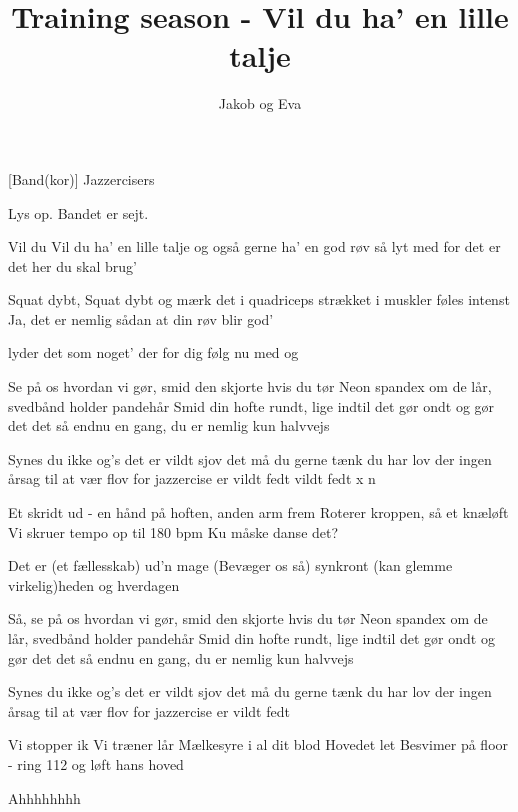 \documentclass{ucph-revy}
\author{Jakob og Eva}
\title{Training season - Vil du ha' en lille talje}
\begin{document}
\maketitle
	\begin{roles}
		[Band(kor)] Jazzercisers
	\end{roles}



\begin{song}

\scene Lys op. 
\scene Bandet er sejt. %



 Vil du
Vil du ha’ en lille talje
og også gerne ha’ en god røv
så lyt med for det er det her du skal brug’

Squat dybt, 
Squat dybt og mærk det i quadriceps
strækket i muskler føles intenst
Ja, det er nemlig sådan at din røv blir god’

lyder det som noget’ der for dig
følg nu med og

Se på os hvordan vi gør, smid den skjorte hvis du tør
Neon spandex om de lår, svedbånd holder pandehår
Smid din hofte rundt, lige indtil det gør ondt
og gør det det så endnu en gang, du er nemlig kun halvvejs

Synes du ikke og’s det er vildt sjov  
det må du gerne tænk du har lov
der ingen årsag til at vær flov
for jazzercise er vildt fedt
vildt fedt x n

Et skridt ud - en hånd på hoften, anden arm frem
Roterer kroppen, så et knæløft
Vi skruer tempo op til 180 bpm
\scene Ku måske danse det?

Det er (et fællesskab) ud’n mage
(Bevæger os så) synkront
(kan glemme virkelig)heden 
og hverdagen

Så, se på os hvordan vi gør, smid den skjorte hvis du tør
Neon spandex om de lår, svedbånd holder pandehår
Smid din hofte rundt, lige indtil det gør ondt
og gør det det så endnu en gang, du er nemlig kun halvvejs

Synes du ikke og’s det er vildt sjov  
det må du gerne tænk du har lov
der ingen årsag til at vær flov
for jazzercise er vildt fedt

Vi stopper ik
Vi træner lår
Mælkesyre i al dit blod
Hovedet let
Besvimer på floor - ring 112 og løft hans hoved

Ahhhhhhhh 


\end{song}
\end{document}

